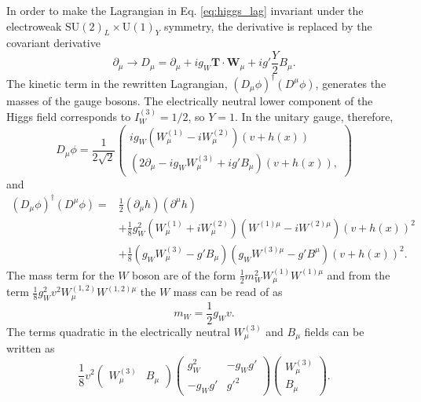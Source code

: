 In order to make the Lagrangian in Eq. \ref{eq:higgs_lag} invariant under the electroweak
$\text{SU}(2)_L \times \text{U}(1)_Y$ symmetry, the derivative is replaced by the covariant
derivative \cite{Thomson:2013zua}
\begin{equation}
\partial_\mu \rightarrow D_\mu = \partial_\mu + i g_W \mathbf{T} \cdot \mathbf{W}_\mu
+ i g' \frac{Y}{2} B_\mu.
\end{equation}
The kinetic term in the rewritten Lagrangian, $(D_\mu \phi)^\dag (D^\mu \phi)$, generates the
masses of the gauge bosons. The electrically neutral lower component of the Higgs field
corresponds to $I_W^{(3)} = 1/2$, so $Y=1$. In the unitary gauge, therefore,
\begin{equation}
D_\mu \phi = \frac{1}{2\sqrt{2}}
\begin{pmatrix}
i g_W (W_\mu^{(1)} - i W_\mu^{(2)})(v+h(x)) \\
(2 \partial_\mu - ig_W W_\mu^{(3)} + ig'B_\mu) (v+h(x)),
\end{pmatrix}
\end{equation}
and
\begin{equation}
\begin{aligned}
(D_\mu \phi)^\dag (D^\mu \phi) =
& \frac{1}{2} (\partial_\mu h)(\partial^\mu h) \\ 
&+ \frac{1}{8} g_W^2 (W_\mu^{(1)} + iW_\mu^{(2)}) (W^{(1)\mu} - iW^{(2)\mu}) (v+h(x))^2 \\
&+ \frac{1}{8} (g_W W_\mu^{(3)} - g'B_\mu)(g_W W^{(3)\mu} - g'B^\mu) (v+h(x))^2.
\end{aligned}
\label{eq:kinetic}
\end{equation}
The mass term for the $W$ boson are of the form $\frac{1}{2}m_W^2 W_\mu^{(1)}W^{(1)\mu}$
and from the term $\frac{1}{8} g_W^2 v^2 W_\mu^{(1, 2)}W^{(1, 2)\mu}$ the $W$ mass can be
read of as
\begin{equation}
m_W = \frac{1}{2} g_W v.
\end{equation}
The terms quadratic in the electrically neutral $W_\mu^{(3)}$ and $B_\mu$ fields can be
written as
\begin{equation}
\frac{1}{8} v^2
\begin{pmatrix}
W_\mu^{(3)} & B_\mu
\end{pmatrix}
\begin{pmatrix}
g_W^2    & - g_W g' \\
- g_W g' & g'^2
\end{pmatrix}
\begin{pmatrix}
W_\mu^{(3)} \\
B_\mu
\end{pmatrix}.
\end{equation}
